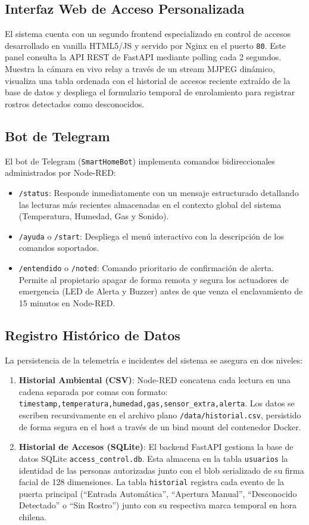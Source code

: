 \documentclass[12pt,letterpaper]{article}
\begin{document}
\subsection{Interfaz Web de Acceso Personalizada}
El sistema cuenta con un segundo frontend especializado en control de accesos desarrollado en vanilla HTML5/JS y servido por Nginx en el puerto \texttt{80}. Este panel consulta la API REST de FastAPI mediante polling cada 2 segundos. Muestra la cámara en vivo relay a través de un stream MJPEG dinámico, visualiza una tabla ordenada con el historial de accesos reciente extraído de la base de datos y despliega el formulario temporal de enrolamiento para registrar rostros detectados como desconocidos.

\subsection{Bot de Telegram}
El bot de Telegram (\texttt{SmartHomeBot}) implementa comandos bidireccionales administrados por Node-RED:
\begin{itemize}
    \item \texttt{/status}: Responde inmediatamente con un mensaje estructurado detallando las lecturas más recientes almacenadas en el contexto global del sistema (Temperatura, Humedad, Gas y Sonido).
    \item \texttt{/ayuda} o \texttt{/start}: Despliega el menú interactivo con la descripción de los comandos soportados.
    \item \texttt{/entendido} o \texttt{/noted}: Comando prioritario de confirmación de alerta. Permite al propietario apagar de forma remota y segura los actuadores de emergencia (LED de Alerta y Buzzer) antes de que venza el enclavamiento de 15 minutos en Node-RED.
\end{itemize}

\subsection{Registro Histórico de Datos}
La persistencia de la telemetría e incidentes del sistema se asegura en dos niveles:
\begin{enumerate}
    \item \textbf{Historial Ambiental (CSV)}: Node-RED concatena cada lectura en una cadena separada por comas con formato: \texttt{timestamp,temperatura,humedad,gas,sensor\_extra,alerta}. Los datos se escriben recursivamente en el archivo plano \texttt{/data/historial.csv}, persistido de forma segura en el host a través de un bind mount del contenedor Docker.
    \item \textbf{Historial de Accesos (SQLite)}: El backend FastAPI gestiona la base de datos SQLite \texttt{access\_control.db}. Esta almacena en la tabla \texttt{usuarios} la identidad de las personas autorizadas junto con el blob serializado de su firma facial de 128 dimensiones. La tabla \texttt{historial} registra cada evento de la puerta principal (``Entrada Automática'', ``Apertura Manual'', ``Desconocido Detectado'' o ``Sin Rostro'') junto con su respectiva marca temporal en hora chilena.
\end{enumerate}
\end{document}
